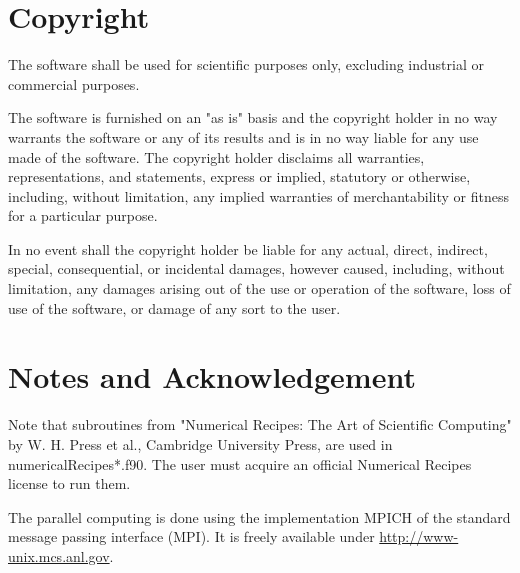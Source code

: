 \documentclass[a4paper,
                          headsepline,
                          listof=totoc,
                          toc=listof,
                          headings=small]{scrreprt} %
\begin{document}
\chapter{Copyright}

The software shall be used for scientific purposes only, excluding industrial or commercial purposes.

The software is furnished on an "as is" basis and the copyright holder in no way warrants 
the software or any of its results and is in no way liable for any use made of the software.  
The copyright holder disclaims all warranties, representations, and statements, express or implied, statutory or otherwise, including, without limitation, any implied warranties of 
merchantability or fitness for a particular purpose. 

In no event shall the copyright holder be liable for any actual, direct, indirect, special, consequential, or incidental damages, however caused, including, without limitation, any damages arising out of the use or operation of the software, loss of use of the software, or damage of any sort to the user.

      
\chapter{Notes and Acknowledgement}

Note that subroutines from "Numerical Recipes: The Art of Scientific Computing"
by W. H. Press et al., Cambridge University Press, are used in
numericalRecipes*.f90. The user must acquire an official
Numerical Recipes license to run them.

The parallel computing is done using the implementation MPICH of the standard message passing 
interface (MPI). It is freely available under \href{http://www-unix.mcs.anl.gov}{http://www-unix.mcs.anl.gov}.


\end{document}
